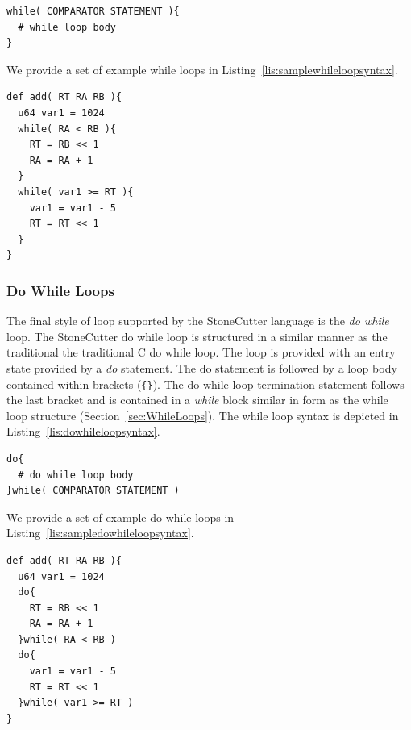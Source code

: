 \documentclass{article}
\begin{document}
\vspace{0.125in}
\begin{lstlisting}[frame=single,style=base,caption={While Loop Syntax},captionpos=b,label={lis:whileloopsyntax}]
while( COMPARATOR STATEMENT ){
  # while loop body
}
\end{lstlisting}

We provide a set of example while loops in Listing~\ref{lis:samplewhileloopsyntax}.

\vspace{0.125in}
\begin{lstlisting}[frame=single,style=base,caption={Sample While Loop Syntax},captionpos=b,label={lis:samplewhileloopsyntax}]
def add( RT RA RB ){
  u64 var1 = 1024
  while( RA < RB ){
    RT = RB << 1
    RA = RA + 1
  }
  while( var1 >= RT ){
    var1 = var1 - 5
    RT = RT << 1
  }
}
\end{lstlisting}

\clearpage
\subsubsection{Do While Loops}
\label{sec:DoWhileLoops}

The final style of loop supported by the StoneCutter language is the \textit{do while} loop.  The StoneCutter do while 
loop is structured in a similar manner as the traditional the traditional C do while loop.  The loop is provided with 
an entry state provided by a \textit{do} statement.  The do statement is followed by a loop body contained within brackets 
(\texttt{\{\}}).  The do while loop termination statement follows the last bracket and is contained in a \textit{while} block similar 
in form as the while loop structure (Section~\ref{sec:WhileLoops}).  The while loop syntax is depicted in 
Listing~\ref{lis:dowhileloopsyntax}.   

\vspace{0.125in}
\begin{lstlisting}[frame=single,style=base,caption={Do While Loop Syntax},captionpos=b,label={lis:dowhileloopsyntax}]
do{
  # do while loop body
}while( COMPARATOR STATEMENT )
\end{lstlisting}

We provide a set of example do while loops in Listing~\ref{lis:sampledowhileloopsyntax}.

\vspace{0.125in}
\begin{lstlisting}[frame=single,style=base,caption={Sample Do While Loop Syntax},captionpos=b,label={lis:sampledowhileloopsyntax}]
def add( RT RA RB ){
  u64 var1 = 1024
  do{
    RT = RB << 1
    RA = RA + 1
  }while( RA < RB )
  do{
    var1 = var1 - 5
    RT = RT << 1
  }while( var1 >= RT )
}
\end{lstlisting}
\end{document}

